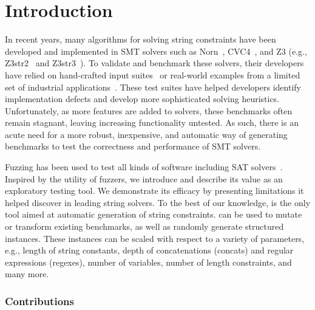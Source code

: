 \section{Introduction}

In recent years, many algorithms for solving string constraints have
been developed and implemented in SMT solvers such as
Norn~\cite{norn}, CVC4~\cite{cvc4}, and Z3 (e.g., Z3str2~\cite{z3str2}
and Z3str3~\cite{z3str3}).  To validate and benchmark these solvers,
their developers have relied on hand-crafted input
suites~\cite{cvc4-tests,z3str3-tests,z3str2-tests} or real-world
examples from a limited set of industrial
applications~\cite{kaluza,kausler}. These test suites have helped
developers identify implementation defects and develop more
sophisticated solving heuristics. Unfortunately, as more features are
added to solvers, these benchmarks often remain stagnant, leaving
increasing functionality untested.  As such, there is an acute need
for a more robust, inexpensive, and automatic way of generating
benchmarks to test the correctness and performance of SMT solvers.

Fuzzing has been used to test all kinds of software including SAT
solvers~\cite{fuzzsat}. Inspired by the utility of fuzzers, we
introduce \fuzzer{} and describe its value as an exploratory testing
tool. We demonstrate its efficacy by presenting limitations it helped
discover in leading string solvers. To the best of our knowledge,
\fuzzer{} is the only tool aimed at automatic generation of string
constraints. \fuzzer{} can be used to mutate or transform existing
benchmarks, as well as randomly generate structured instances. These
instances can be scaled with respect to a variety of parameters, e.g.,
length of string constants, depth of concatenations (concats) and
regular expressions (regexes), number of variables, number of length
constraints, and many more.

\subsubsection{Contributions}

